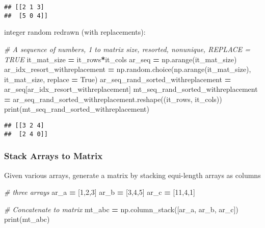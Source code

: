 \documentclass[
]{book}
\newenvironment{Shaded}{\begin{snugshade}}{\end{snugshade}}
\newcommand{\BuiltInTok}[1]{#1}
\newcommand{\CommentTok}[1]{\textcolor[rgb]{0.56,0.35,0.01}{\textit{#1}}}
\newcommand{\DecValTok}[1]{\textcolor[rgb]{0.00,0.00,0.81}{#1}}
\newcommand{\NormalTok}[1]{#1}
\newcommand{\OperatorTok}[1]{\textcolor[rgb]{0.81,0.36,0.00}{\textbf{#1}}}
\newcommand{\VariableTok}[1]{\textcolor[rgb]{0.00,0.00,0.00}{#1}}
\begin{document}
\begin{verbatim}
## [[2 1 3]
##  [5 0 4]]
\end{verbatim}

integer random redrawn (with replacements):

\begin{Shaded}
\begin{Highlighting}[]
\CommentTok{\# A sequence of numbers, 1 to matrix size, resorted, nonunique, REPLACE = TRUE}
\NormalTok{it\_mat\_size }\OperatorTok{=}\NormalTok{ it\_rows}\OperatorTok{*}\NormalTok{it\_cols}
\NormalTok{ar\_seq }\OperatorTok{=}\NormalTok{ np.arange(it\_mat\_size)}
\NormalTok{ar\_idx\_resort\_withreplacement }\OperatorTok{=}\NormalTok{ np.random.choice(np.arange(it\_mat\_size), it\_mat\_size, replace }\OperatorTok{=} \VariableTok{True}\NormalTok{)}
\NormalTok{ar\_seq\_rand\_sorted\_withreplacement }\OperatorTok{=}\NormalTok{ ar\_seq[ar\_idx\_resort\_withreplacement]}
\NormalTok{mt\_seq\_rand\_sorted\_withreplacement }\OperatorTok{=}\NormalTok{ ar\_seq\_rand\_sorted\_withreplacement.reshape((it\_rows, it\_cols))}
\BuiltInTok{print}\NormalTok{(mt\_seq\_rand\_sorted\_withreplacement)}
\end{Highlighting}
\end{Shaded}

\begin{verbatim}
## [[3 2 4]
##  [2 4 0]]
\end{verbatim}

\hypertarget{stack-arrays-to-matrix}{%
\subsubsection{Stack Arrays to Matrix}\label{stack-arrays-to-matrix}}

Given various arrays, generate a matrix by stacking equi-length arrays as columns

\begin{Shaded}
\begin{Highlighting}[]
\CommentTok{\# three arrays}
\NormalTok{ar\_a }\OperatorTok{=}\NormalTok{ [}\DecValTok{1}\NormalTok{,}\DecValTok{2}\NormalTok{,}\DecValTok{3}\NormalTok{]}
\NormalTok{ar\_b }\OperatorTok{=}\NormalTok{ [}\DecValTok{3}\NormalTok{,}\DecValTok{4}\NormalTok{,}\DecValTok{5}\NormalTok{]}
\NormalTok{ar\_c }\OperatorTok{=}\NormalTok{ [}\DecValTok{11}\NormalTok{,}\DecValTok{4}\NormalTok{,}\DecValTok{1}\NormalTok{]}

\CommentTok{\# Concatenate to matrix}
\NormalTok{mt\_abc }\OperatorTok{=}\NormalTok{ np.column\_stack([ar\_a, ar\_b, ar\_c])}
\BuiltInTok{print}\NormalTok{(mt\_abc)}
\end{Highlighting}
\end{Shaded}
\end{document}
